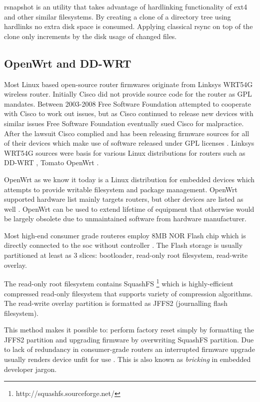 \documentclass[a4paper,11pt]{kth-mag}
\begin{document}
rsnapshot is an utility that takes advantage of hardlinking
functionality of \acrshort{ext4} and other similar filesystems.
By creating a clone of a directory tree using hardlinks no
extra disk space is consumed. Applying classical rsync on top of
the clone only increments by the disk usage of changed files.


\subsection{OpenWrt and DD-WRT}

Most Linux based open-source router firmwares originate from
Linksys WRT54G wireless router.
Initially Cisco did not provide source code for the router as GPL mandates.
Between 2003-2008 Free Software Foundation attempted to cooperate
with Cisco to work out issues, but as Cisco continued to release
new devices with similar issues Free Software Foundation eventually
sued Cisco for malpractice.
After the lawsuit Cisco complied and has been releasing firmware
sources for all of their devices which make use of software
released under GPL licenses
\cite{fsf-vs-cisco}.
Linksys WRT54G sources were basis for various Linux distributions for routers such as
DD-WRT \cite{dd-wrt},
Tomato \cite{tomato}
OpenWrt \cite{openwrt}.

OpenWrt as we know it today is a Linux distribution for embedded devices
which attempts to provide writable filesystem and package management.
OpenWrt supported hardware list mainly targets routers, but other devices are
listed as well \cite{openwrt-toh}. OpenWrt can be used to
extend lifetime of equipment that otherwise would be largely obsolete due
to unmaintained software from hardware manufacturer.

Most high-end consumer grade routeres employ 8MB NOR Flash chip which is
directly connected to the \acrshort{soc} without controller
\cite{openwrt-flash-layout}.
The Flash storage is usually partitioned at least as 3 slices:
bootloader, read-only root filesystem, read-write overlay.

The read-only root filesystem contains SquashFS
\footnote{http://squashfs.sourceforge.net/}
which is highly-efficient compressed read-only filesystem that
supports variety of compression algorithms.
The read-write overlay partition
is formatted as JFFS2 (journalling flash filesystem).

This method makes it possible to: perform factory reset simply by
formatting the JFFS2 partition and upgrading firmware by overwriting
SquashFS partition. Due to lack of redundancy in consumer-grade routers
an interrupted firmware upgrade usually renders device unfit for use
\cite{building-murphy-compatible-embedded-linux-systems}
\cite{safe-upgrade-of-embedded-systems}.
This is also known as \emph{bricking} in embedded developer jargon.
\end{document}
